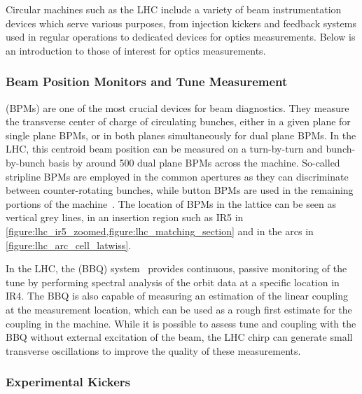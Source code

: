 Circular machines such as the LHC include a variety of beam instrumentation devices which serve various purposes, from injection kickers and feedback systems used in regular operations to dedicated devices for optics measurements.
Below is an introduction to those of interest for optics measurements.

\subsubsection*{Beam Position Monitors and Tune Measurement}

 (BPMs) are one of the most crucial devices for beam diagnostics.
They measure the transverse center of charge of circulating bunches, either in a given plane for single plane BPMs, or in both planes simultaneously for dual plane BPMs.
In the LHC, this centroid beam position can be measured on a turn-by-turn and bunch-by-bunch basis by around \num{500} dual plane BPMs across the machine.
So-called stripline BPMs are employed in the common apertures as they can discriminate between counter-rotating bunches, while button BPMs are used in the remaining portions of the machine~\cite{BOOK:Bruning:LHC_Design_Report_Main_Ring}. 
The location of BPMs in the lattice can be seen as vertical grey lines, in an insertion region such as IR\num{5} in \cref{figure:lhc_ir5_zoomed,figure:lhc_matching_section} and in the arcs in \cref{figure:lhc_arc_cell_latwiss}.

In the LHC, the  (BBQ) system~\cite{CERN:Boccardi:LHC_Transverse_Diagnostics_Systems,CERN:Boccardi:LHC_BBQ_Tune_Chromaticity_Systems} provides continuous, passive monitoring of the tune by performing spectral analysis of the orbit data at a specific location in IR\num{4}.
The BBQ is also capable of measuring an estimation of the linear coupling at the measurement location, which can be used as a rough first estimate for the coupling in the machine.
While it is possible to assess tune and coupling with the BBQ without external excitation of the beam, the LHC chirp can generate small transverse oscillations to improve the quality of these measurements.

\subsubsection*{Experimental Kickers}

